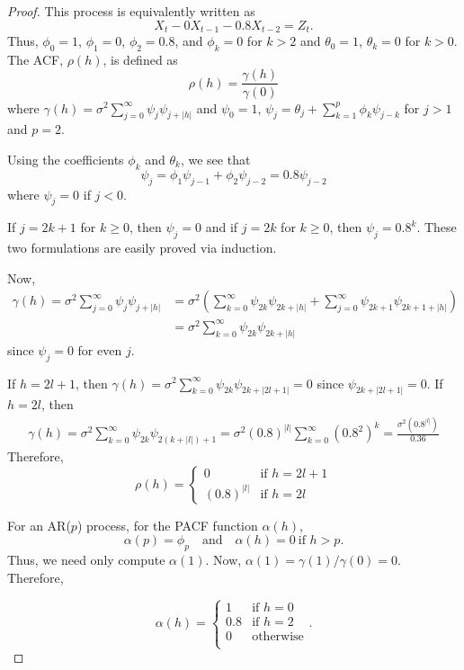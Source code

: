 \documentclass[12pt]{article}
\theoremstyle{definition}
\begin{document}
\begin{proof}
  This process is equivalently written as
  \[
    X_t - 0X_{t-1} - 0.8X_{t-2} = Z_t.
  \]
  Thus, $\phi_0 = 1$, $\phi_1 = 0$, $\phi_2 = 0.8$, and $\phi_k = 0$ for $k > 2$
  and $\theta_0 = 1$, $\theta_k = 0$ for $k > 0$. The ACF, $\rho(h)$, is defined
  as
  \[
    \rho(h) = \frac{\gamma(h)}{\gamma(0)}
  \]
  where $\gamma(h) = \sigma^2 \sum_{j=0}^\infty \psi_j \psi_{j+|h|}$ and $\psi_0 = 1$,
  $\psi_j = \theta_j + \sum_{k=1}^p \phi_k \psi_{j-k}$ for $j >1$ and $p=2$.

  Using the coefficients $\phi_k$ and $\theta_k$, we see that
  \[
    \psi_j = \phi_1 \psi_{j-1} + \phi_2 \psi_{j-2} = 0.8\psi_{j-2}
  \]
  where $\psi_j = 0$ if $j<0$.

  If $j = 2k+1$ for $k\geq 0$, then $\psi_j = 0$ and if $j = 2k$ for $k\geq 0$,
  then $\psi_j = 0.8^k$. These two formulations are easily proved via induction.

  Now,
  \begin{align*}
    \gamma(h) = \sigma^2 \sum_{j=0}^\infty \psi_j \psi_{j + |h|}
    &= \sigma^2 \left(\sum_{k=0}^\infty \psi_{2k} \psi_{2k + |h|} + \sum_{j=0}^\infty \psi_{2k+1} \psi_{2k+1 + |h|}\right) \\
    &= \sigma^2 \sum_{k=0}^\infty \psi_{2k} \psi_{2k + |h|}
  \end{align*}
  since $\psi_j = 0$ for even $j$.

  If $h = 2l + 1$, then $\gamma(h) = \sigma^2 \sum_{k=0}^\infty \psi_{2k} \psi_{2k + |2l+1|} = 0$
  since $\psi_{2k + |2l+1|} = 0$. If $h =2l$, then
  \begin{align*}
    \gamma(h) = \sigma^2 \sum_{k=0}^\infty \psi_{2k} \psi_{2(k+ |l|) + 1} = \sigma^2 (0.8)^{|l|} \sum_{k=0}^\infty (0.8^2)^k = \frac{\sigma^2(0.8^{|l|})}{0.36}
  \end{align*}
  Therefore,
  \[
  \rho(h) =
  \begin{cases}
    0 & \text{if $h = 2l + 1$}\\
    (0.8)^{|l|} & \text{if $h = 2l$}
  \end{cases}
  \]

  For an AR($p$) process, for the PACF function $\alpha(h)$,
  \[
    \alpha(p) = \phi_p \quad \text{and} \quad \alpha(h) = 0 \ \text{if $h>p$}.
  \]
  Thus, we need only compute $\alpha(1)$. Now, $\alpha(1) = \gamma(1) / \gamma(0) = 0$.
  Therefore,

  \[
  \alpha(h) =
  \begin{cases}
    1 & \text{if $h = 0$}\\
    0.8 & \text{if $h = 2$}\\
    0 & \text{otherwise}\\
  \end{cases}.
  \]
\end{proof}
\end{document}
